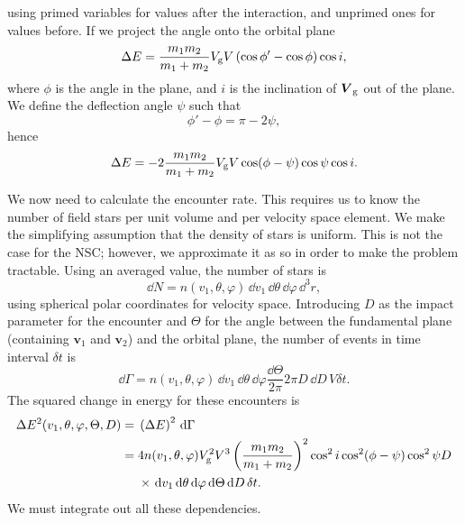 using primed variables for values after the interaction, and unprimed ones for values before. If we project the angle onto the orbital plane
\begin{equation}
\Delta E = \dfrac{m_1 m_2}{m_1 + m_2}V_\mathrm{g}V\left(\cos\phi' - \cos\phi\right)\cos i,
\end{equation}
where $\phi$ is the angle in the plane, and $i$ is the inclination of $\boldsymbol{V}_\mathrm{g}$ out of the plane. We define the deflection angle $\psi$ such that
\begin{equation}
\phi' - \phi = \pi - 2\psi,
\end{equation}
hence
\begin{equation}
\Delta E = -2\dfrac{m_1 m_2}{m_1 + m_2}V_\mathrm{g}V\cos(\phi - \psi)\cos\psi\cos i.
\end{equation}

We now need to calculate the encounter rate. This requires us to know the number of field stars per unit volume and per velocity space element. We make the simplifying assumption that the density of stars is uniform. This is not the case for the NSC; however, we approximate it as so in order to make the problem tractable. Using an averaged value, the number of stars is
\begin{equation}
\dd N = n(v_1, \theta, \varphi)\,\dd v_1 \,\dd \theta \,\dd \varphi \,\dd^3r,
\end{equation}
using spherical polar coordinates for velocity space. Introducing $D$ as the impact parameter for the encounter and $\Theta$ for the angle between the fundamental plane (containing $\boldsymbol{v}_1$ and $\boldsymbol{v}_2$) and the orbital plane, the number of events in time interval $\delta t$ is
\begin{equation}
\dd \Gamma =  n(v_1, \theta, \varphi)\,\dd v_1 \,\dd \theta \,\dd \varphi \dfrac{\dd \Theta}{2\pi} 2\pi D \,\dd D \,V \delta t.
\end{equation}
The squared change in energy for these encounters is
\begin{align}
\Delta E^2(v_1,\theta,\varphi,\Theta,D) = {} & \left(\Delta E\right)^2\,\mathrm{d} \Gamma\\
 = {} & 4 n(v_1,\theta,\varphi)V_\mathrm{g}^2V^3\left(\dfrac{m_1m_2}{m_1+m_2}\right)^2\cos^2i\cos^2(\phi-\psi)\cos^2\psi D \nonumber \\*
 {} & \times \left. \mathrm{d} v_1\,\mathrm{d}\theta\,\mathrm{d}\varphi\,\mathrm{d}\Theta\,\mathrm{d} D\,\delta t. \right.
\end{align}
We must integrate out all these dependencies.

